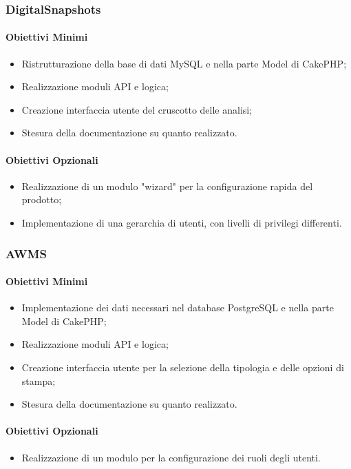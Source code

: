 \subsubsection*{DigitalSnapshots}
\paragraph*{Obiettivi Minimi}
\begin{itemize}
\item Ristrutturazione della base di dati MySQL e nella parte Model di CakePHP;
\item Realizzazione moduli API e logica;
\item Creazione interfaccia utente del cruscotto delle analisi; 
\item Stesura della documentazione su quanto realizzato.
\end{itemize}

\paragraph*{Obiettivi Opzionali}
\begin{itemize}
\item Realizzazione di un modulo "wizard" per la configurazione rapida del prodotto;
\item Implementazione di una gerarchia di utenti, con livelli di privilegi differenti.
\end{itemize}

\subsubsection*{AWMS}
\paragraph*{Obiettivi Minimi}
\begin{itemize}
\item Implementazione dei dati necessari nel database PostgreSQL e nella parte Model di CakePHP;
\item Realizzazione moduli API e logica;
\item Creazione interfaccia utente per la selezione della tipologia e delle opzioni di stampa; 
\item Stesura della documentazione su quanto realizzato.
\end{itemize}

\paragraph*{Obiettivi Opzionali}
\begin{itemize}
\item Realizzazione di un modulo per la configurazione dei ruoli degli utenti.
\end{itemize}

